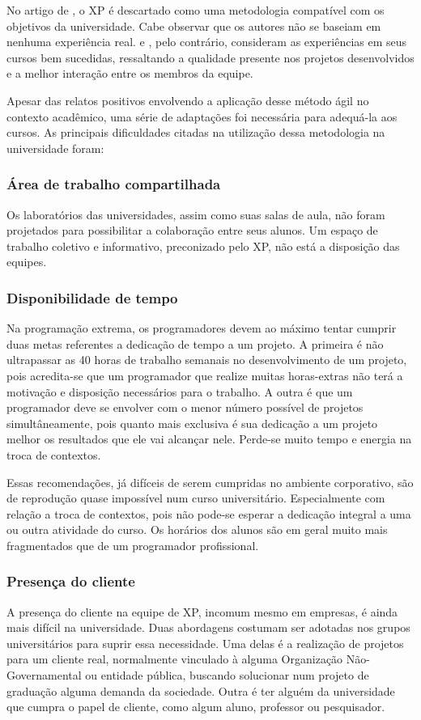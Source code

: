     No artigo de , o XP é descartado como uma metodologia compatível com os objetivos da universidade. Cabe observar que os autores não se baseiam em nenhuma experiência real.  e , pelo contrário, consideram as experiências em seus cursos bem sucedidas, ressaltando a qualidade presente nos projetos desenvolvidos e a melhor interação entre os membros da equipe.

    Apesar das relatos positivos envolvendo a aplicação desse método ágil no contexto acadêmico, uma série de adaptações foi necessária para adequá-la aos cursos. As principais dificuldades citadas na utilização dessa metodologia na universidade foram:

    \subsubsection{Área de trabalho compartilhada}
      Os laboratórios das universidades, assim como suas salas de aula, não foram projetados para possibilitar a colaboração entre seus alunos. Um espaço de trabalho coletivo e informativo, preconizado pelo XP, não está a disposição das equipes.

    \subsubsection{Disponibilidade de tempo}
      Na programação extrema, os programadores devem ao máximo tentar cumprir duas metas referentes a dedicação de tempo a um projeto. A primeira é não ultrapassar as 40 horas de trabalho semanais no desenvolvimento de um projeto, pois acredita-se que um programador que realize muitas horas-extras não terá a motivação e disposição necessários para o trabalho. A outra é que um programador deve se envolver com o menor número possível de projetos simultâneamente, pois quanto mais exclusiva é sua dedicação a um projeto melhor os resultados que ele vai alcançar nele. Perde-se muito tempo e energia na troca de contextos. 

      Essas recomendações, já difíceis de serem cumpridas no ambiente corporativo, são de reprodução quase impossível num curso universitário. Especialmente com relação a troca de contextos, pois não pode-se esperar a dedicação integral a uma ou outra atividade do curso. Os horários dos alunos são em geral muito mais fragmentados que de um programador profissional.

    \subsubsection{Presença do cliente}
      A presença do cliente na equipe de XP, incomum mesmo em empresas, é ainda mais difícil na universidade. Duas abordagens costumam ser adotadas nos grupos universitários para suprir essa necessidade. Uma delas é a realização de projetos para um cliente real, normalmente vinculado à alguma Organização Não-Governamental ou entidade pública, buscando solucionar num projeto de graduação alguma demanda da sociedade. Outra é ter alguém da universidade que cumpra o papel de cliente, como algum aluno, professor ou pesquisador.

